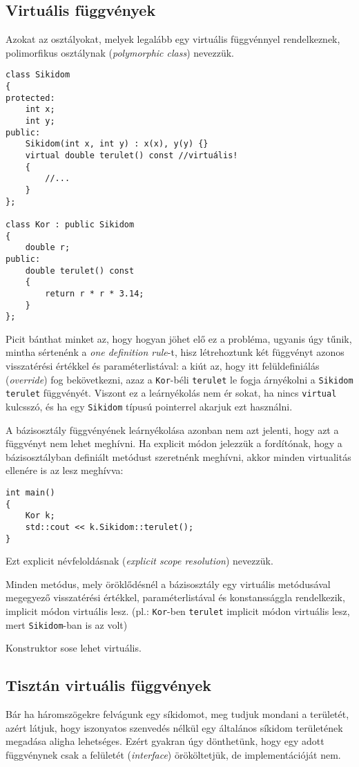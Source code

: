 \documentclass[a4paper,11.5pt,table]{article}
\begin{document}
	\subsection{Virtuális függvények}
	Azokat az osztályokat, melyek legalább egy virtuális függvénnyel rendelkeznek, polimorfikus osztálynak (\textit{polymorphic class}) nevezzük.
\begin{lstlisting}
class Sikidom
{
protected:
	int x;
	int y;
public:
	Sikidom(int x, int y) : x(x), y(y) {}
	virtual double terulet() const //virtuális!
	{
		//...
	}
};

class Kor : public Sikidom
{
	double r;
public:
	double terulet() const
	{
		return r * r * 3.14;
	}
};
\end{lstlisting}
	Picit bánthat minket az, hogy hogyan jöhet elő ez a probléma, ugyanis úgy tűnik, mintha sértenénk a \textit{one definition rule}-t, hisz létrehoztunk két függvényt azonos visszatérési értékkel és paraméterlistával: a kiút az, hogy itt felüldefiniálás (\textit{override}) fog bekövetkezni, azaz a \texttt{Kor}-béli \texttt{terulet} le fogja árnyékolni a \texttt{Sikidom} \texttt{terulet} függvényét. Viszont ez a leárnyékolás nem ér sokat, ha nincs \texttt{virtual} kulcsszó, és ha egy \texttt{Sikidom} típusú pointerrel akarjuk ezt használni.
	
	A bázisosztály függvényének leárnyékolása azonban nem azt jelenti, hogy azt a függvényt nem lehet meghívni. Ha explicit módon jelezzük a fordítónak, hogy a bázisosztályban definiált metódust szeretnénk meghívni, akkor minden virtualitás ellenére is az lesz meghívva:
	\begin{lstlisting}
int main()
{
	Kor k;
	std::cout << k.Sikidom::terulet();
}
	\end{lstlisting}
	Ezt explicit névfeloldásnak (\textit{explicit scope resolution}) nevezzük.
	\begin{note}
		Minden metódus, mely öröklődésnél a bázisosztály egy virtuális metódusával megegyező visszatérési értékkel, paraméterlistával és konstanssággla rendelkezik, implicit módon virtuális lesz. (pl.: \texttt{Kor}-ben \texttt{terulet} implicit módon virtuális lesz, mert \texttt{Sikidom}-ban is az volt)
	\end{note}
	Konstruktor sose lehet virtuális.
	\subsection{Tisztán virtuális függvények}
	Bár ha háromszögekre felvágunk egy síkidomot, meg tudjuk mondani a területét, azért látjuk, hogy iszonyatos szenvedés nélkül egy általános síkidom területének megadása aligha lehetséges. Ezért gyakran úgy dönthetünk, hogy egy adott függvénynek csak a felületét (\textit{interface}) örököltetjük, de implementációját nem.
	
\end{document}
